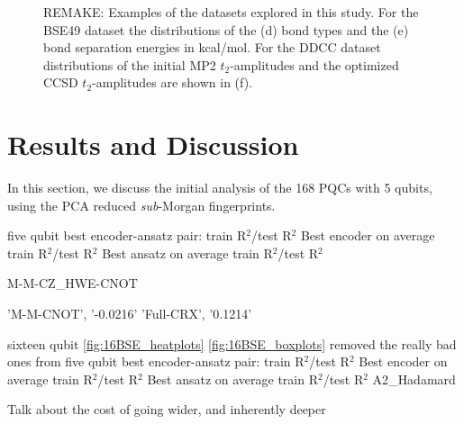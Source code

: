 \documentclass[journal=jacsat,manuscript=article]{achemso}
\begin{document}
\begin{figure}[H]
\begin{subfigure}[b]{0.3\textwidth}
		\caption{}
		\label{fig:waterddccdistribution}
	\end{subfigure}	
	\caption{REMAKE: Examples of the datasets explored in this study. For the BSE49 dataset the distributions of the (d) bond types and the (e) bond separation energies in kcal/mol. For the DDCC dataset distributions of the initial MP2 $t_{2}$-amplitudes and the optimized CCSD $t_{2}$-amplitudes are shown in (f).}
	\label{fig:bse_data}
\end{figure}





\section{Results and Discussion}
\label{section:results_and_discussion}
In this section, we discuss the initial analysis of the 168 PQCs with 5 qubits, using the PCA reduced \textit{sub}-Morgan fingerprints.





five qubit 
best encoder-ansatz pair: train R$^{2}$/test R$^{2}$
Best encoder on average train R$^{2}$/test R$^{2}$
Best ansatz on average train R$^{2}$/test R$^{2}$

M-M-CZ{\_}HWE-CNOT

'M-M-CNOT', '-0.0216'
'Full-CRX', '0.1214'

sixteen qubit \ref{fig:16BSE_heatplots} \ref{fig:16BSE_boxplots}
removed the really bad ones from five qubit
best encoder-ansatz pair: train R$^{2}$/test R$^{2}$
Best encoder on average train R$^{2}$/test R$^{2}$
Best ansatz on average train R$^{2}$/test R$^{2}$
A2{\_}Hadamard

Talk about the cost of going wider, and inherently deeper
\end{document}

